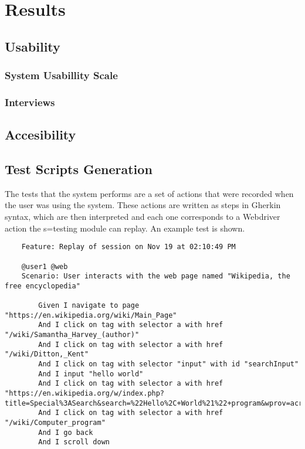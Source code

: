 \section{Results}


\subsection{Usability}

\subsubsection{System Usabillity Scale}

\subsubsection{Interviews}

\subsection{Accesibility}

\subsection{Test Scripts Generation}

The tests that the system performs are a set of actions that were recorded when the user was using the system. These actions are written as steps in Gherkin syntax, which are then interpreted and each one corresponds to a Webdriver action the s=testing module can replay. An example test is shown.

\begin{lstlisting}
    Feature: Replay of session on Nov 19 at 02:10:49 PM

    @user1 @web
    Scenario: User interacts with the web page named "Wikipedia, the free encyclopedia"
    
        Given I navigate to page "https://en.wikipedia.org/wiki/Main_Page"
        And I click on tag with selector a with href "/wiki/Samantha_Harvey_(author)"
        And I click on tag with selector a with href "/wiki/Ditton,_Kent"
        And I click on tag with selector "input" with id "searchInput"
        And I input "hello world"
        And I click on tag with selector a with href "https://en.wikipedia.org/w/index.php?title=Special%3ASearch&search=%22Hello%2C+World%21%22+program&wprov=acrw1_0"
        And I click on tag with selector a with href "/wiki/Computer_program"
        And I go back
        And I scroll down
\end{lstlisting}
